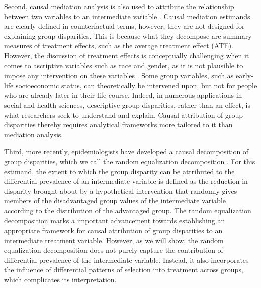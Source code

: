 \documentclass[12pt,a4paper]{article}
\begin{document}
Second, causal mediation analysis is also used to attribute the relationship between two variables to an intermediate variable \citep{vanderweele_explanation_2015}. Causal mediation estimands are clearly defined in counterfactual terms, however, they are not designed for explaining group disparities. This is because what they decompose are summary measures of treatment effects, such as the average treatment effect (ATE). However, the discussion of treatment effects is conceptually challenging when it comes to ascriptive variables such as race and gender, as it is not plausible to impose any intervention on these variables \citep{rubin_estimating_1974}. Some group variables, such as early-life socioeconomic status, can theoretically be intervened upon, but not for people who are already later in their life course. Indeed, in numerous applications in social and health sciences, descriptive group disparities, rather than an effect, is what researchers seek to understand and explain. Causal attribution of group disparities thereby requires analytical frameworks more tailored to it than mediation analysis.  

Third, more recently, epidemiologists have developed a causal decomposition of group disparities, which we call the random equalization decomposition \citep{vanderweele_causal_2014, jackson_decomposition_2018}. For this estimand, the extent to which the group disparity can be attributed to the differential prevalence of an intermediate variable is defined as the reduction in disparity brought about by a hypothetical intervention that randomly gives members of the disadvantaged group values of the intermediate variable according to the distribution of the advantaged group. The random equalization decomposition marks a important advancement towards establishing an appropriate framework for causal attribution of group disparities to an intermediate treatment variable. However, as we will show, the random equalization decomposition does not purely capture the contribution of differential prevalence of the intermediate variable. Instead, it also incorporates the influence of differential patterns of selection into treatment across groups, which complicates its interpretation.
\end{document}
